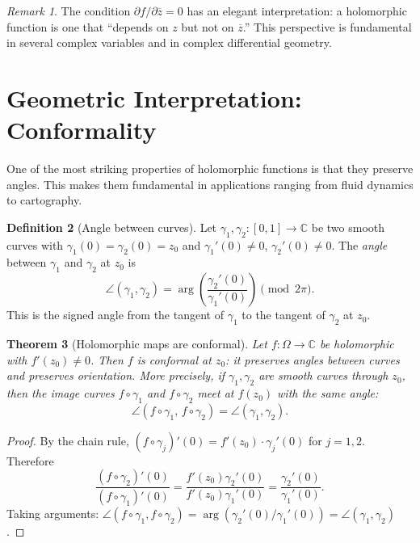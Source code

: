\documentclass[12pt,a4paper,openany]{book}
\theoremstyle{definition}
\newtheorem{definition}{Definition}[chapter]
\theoremstyle{plain}
\newtheorem{theorem}[definition]{Theorem}
\theoremstyle{remark}
\newtheorem{remark}[definition]{Remark}
\newcommand{\C}{\mathbb{C}}
\newcommand{\conj}[1]{\overline{#1}}
\begin{document}
\begin{remark}
The condition $\partial f/\partial\conj{z} = 0$ has an elegant interpretation: a holomorphic function is one that ``depends on $z$ but not on $\conj{z}$.'' This perspective is fundamental in several complex variables and in complex differential geometry.
\end{remark}

\section{Geometric Interpretation: Conformality}
\label{sec:conformality}

One of the most striking properties of holomorphic functions is that they preserve angles. This makes them fundamental in applications ranging from fluid dynamics to cartography.

\begin{definition}[Angle between curves]
\label{def:angle-curves}
Let $\gamma_1,\gamma_2:[0,1]\to\C$ be two smooth curves with $\gamma_1(0)=\gamma_2(0)=z_0$ and $\gamma_1'(0)\neq 0$, $\gamma_2'(0)\neq 0$. The \emph{angle} between $\gamma_1$ and $\gamma_2$ at $z_0$ is
\[
  \angle(\gamma_1,\gamma_2) = \arg\!\left(\frac{\gamma_2'(0)}{\gamma_1'(0)}\right) \pmod{2\pi}.
\]
This is the signed angle from the tangent of $\gamma_1$ to the tangent of $\gamma_2$ at $z_0$.
\end{definition}

\begin{theorem}[Holomorphic maps are conformal]
\label{thm:conformal}
Let $f:\Omega\to\C$ be holomorphic with $f'(z_0)\neq 0$. Then $f$ is \emph{conformal} at $z_0$: it preserves angles between curves and preserves orientation. More precisely, if $\gamma_1,\gamma_2$ are smooth curves through $z_0$, then the image curves $f\circ\gamma_1$ and $f\circ\gamma_2$ meet at $f(z_0)$ with the same angle:
\[
  \angle(f\circ\gamma_1,\, f\circ\gamma_2) = \angle(\gamma_1,\gamma_2).
\]
\end{theorem}

\begin{proof}
By the chain rule, $(f\circ\gamma_j)'(0) = f'(z_0)\cdot\gamma_j'(0)$ for $j=1,2$. Therefore
\[
  \frac{(f\circ\gamma_2)'(0)}{(f\circ\gamma_1)'(0)} = \frac{f'(z_0)\gamma_2'(0)}{f'(z_0)\gamma_1'(0)} = \frac{\gamma_2'(0)}{\gamma_1'(0)}.
\]
Taking arguments: $\angle(f\circ\gamma_1,f\circ\gamma_2) = \arg(\gamma_2'(0)/\gamma_1'(0)) = \angle(\gamma_1,\gamma_2)$.
\end{proof}
\end{document}
